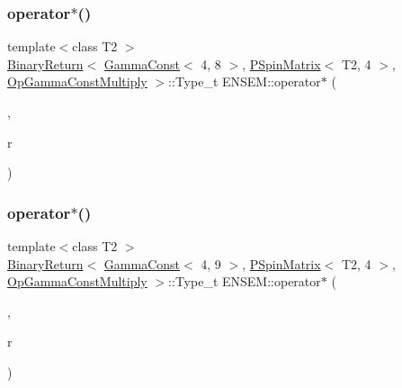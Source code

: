 \subsubsection{\texorpdfstring{operator$\ast$()}{operator*()}\hspace{0.1cm}{\footnotesize\ttfamily [9/64]}}
{\footnotesize\ttfamily template$<$class T2 $>$ \\
\mbox{\hyperlink{structENSEM_1_1BinaryReturn}{Binary\+Return}}$<$ \mbox{\hyperlink{classENSEM_1_1GammaConst}{Gamma\+Const}}$<$ 4, 8 $>$, \mbox{\hyperlink{classENSEM_1_1PSpinMatrix}{P\+Spin\+Matrix}}$<$ T2, 4 $>$, \mbox{\hyperlink{structENSEM_1_1OpGammaConstMultiply}{Op\+Gamma\+Const\+Multiply}} $>$\+::Type\+\_\+t E\+N\+S\+E\+M\+::operator$\ast$ (\begin{DoxyParamCaption}\item[{const \mbox{\hyperlink{classENSEM_1_1GammaConst}{Gamma\+Const}}$<$ 4, 8 $>$ \&}]{,  }\item[{const \mbox{\hyperlink{classENSEM_1_1PSpinMatrix}{P\+Spin\+Matrix}}$<$ T2, 4 $>$ \&}]{r }\end{DoxyParamCaption})\hspace{0.3cm}{\ttfamily [inline]}}

\mbox{\label{group__primspinmatrix_gaa9f2a3db77b04450fdbceeca87443364}} 
\subsubsection{\texorpdfstring{operator$\ast$()}{operator*()}\hspace{0.1cm}{\footnotesize\ttfamily [10/64]}}
{\footnotesize\ttfamily template$<$class T2 $>$ \\
\mbox{\hyperlink{structENSEM_1_1BinaryReturn}{Binary\+Return}}$<$ \mbox{\hyperlink{classENSEM_1_1GammaConst}{Gamma\+Const}}$<$ 4, 9 $>$, \mbox{\hyperlink{classENSEM_1_1PSpinMatrix}{P\+Spin\+Matrix}}$<$ T2, 4 $>$, \mbox{\hyperlink{structENSEM_1_1OpGammaConstMultiply}{Op\+Gamma\+Const\+Multiply}} $>$\+::Type\+\_\+t E\+N\+S\+E\+M\+::operator$\ast$ (\begin{DoxyParamCaption}\item[{const \mbox{\hyperlink{classENSEM_1_1GammaConst}{Gamma\+Const}}$<$ 4, 9 $>$ \&}]{,  }\item[{const \mbox{\hyperlink{classENSEM_1_1PSpinMatrix}{P\+Spin\+Matrix}}$<$ T2, 4 $>$ \&}]{r }\end{DoxyParamCaption})\hspace{0.3cm}{\ttfamily [inline]}}

